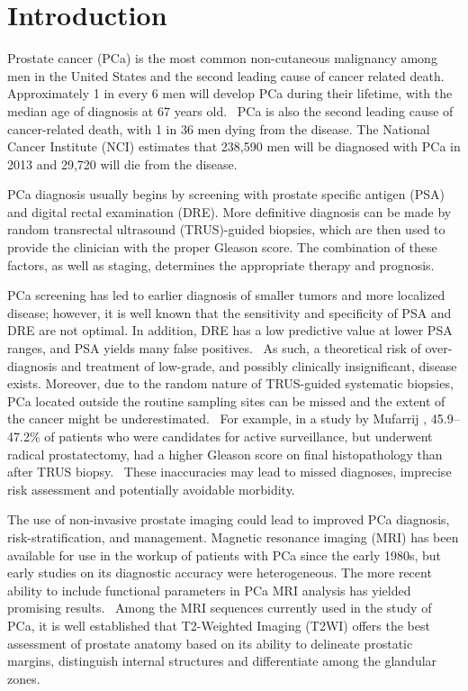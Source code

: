\section{Introduction}\label{sect:intro}
Prostate cancer (PCa) is the most common non-cutaneous malignancy among men in
the United States and the second leading cause of cancer related
death.~\cite{Howlader2011} Approximately 1 in every 6 men will develop PCa
during their lifetime, with the median age of diagnosis at 67 years
old.~\cite{Howlader2011} PCa is also the second leading cause of cancer-related
death, with 1 in 36 men dying from the disease.  The National Cancer Institute
(NCI) estimates that 238,590 men will be diagnosed with PCa in 2013 and 29,720
will die from the disease.~\cite{Howlader2011}

PCa diagnosis usually begins by screening with prostate specific antigen (PSA)
and digital rectal examination (DRE).  More definitive diagnosis can be made by
random transrectal ultrasound (TRUS)-guided biopsies, which are then used to
provide the clinician with the proper Gleason score. The combination of these
factors, as well as staging, determines the appropriate therapy and prognosis.

PCa screening has led to earlier diagnosis of smaller tumors and more localized
disease; however, it is well known that the sensitivity and specificity of PSA
and DRE are not optimal. In addition, DRE has a low predictive value at lower
PSA ranges, and PSA yields many false
positives.~\cite{Gosselaar2007,Gupta2013,Hricak2007} As such, a theoretical
risk of over-diagnosis and treatment of low-grade, and possibly clinically
insignificant, disease exists.  Moreover, due to the random nature of
TRUS-guided systematic biopsies, PCa located outside the routine sampling sites
can be missed and the extent of the cancer might be
underestimated.~\cite{Gupta2013,Cornud2012} For example, in a study by Mufarrij
\etal, 45.9--47.2\% of patients who were candidates for active surveillance,
but underwent radical prostatectomy, had a higher Gleason score on final
histopathology than after TRUS biopsy.~\cite{Mufarrij2010} These inaccuracies
may lead to missed diagnoses, imprecise risk assessment and potentially
avoidable morbidity.

The use of non-invasive prostate imaging could lead to improved PCa diagnosis,
risk-stratification, and management.  Magnetic resonance imaging (MRI) has been
available for use in the workup of patients with PCa since the early 1980s, but
early studies on its diagnostic accuracy were heterogeneous.  The more
recent ability to include functional parameters in PCa MRI analysis has yielded
promising results.~\cite{Gupta2013,Hricak2007} Among the MRI sequences
currently used in the study of PCa, it is well established that T2-Weighted
Imaging (T2WI) offers the best assessment of prostate anatomy based on its
ability to delineate prostatic margins, distinguish internal structures and
differentiate among the glandular zones. 


